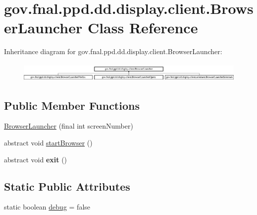 \hypertarget{classgov_1_1fnal_1_1ppd_1_1dd_1_1display_1_1client_1_1BrowserLauncher}{\section{gov.\-fnal.\-ppd.\-dd.\-display.\-client.\-Browser\-Launcher Class Reference}
\label{classgov_1_1fnal_1_1ppd_1_1dd_1_1display_1_1client_1_1BrowserLauncher}
}
Inheritance diagram for gov.\-fnal.\-ppd.\-dd.\-display.\-client.\-Browser\-Launcher\-:\begin{figure}[H]
\begin{center}
\leavevmode
\includegraphics[height=0.942761cm]{classgov_1_1fnal_1_1ppd_1_1dd_1_1display_1_1client_1_1BrowserLauncher}
\end{center}
\end{figure}
\subsection*{Public Member Functions}
\begin{DoxyCompactItemize}
\item 
\hyperlink{classgov_1_1fnal_1_1ppd_1_1dd_1_1display_1_1client_1_1BrowserLauncher_aca76d8caee5d9de33b80e3397292ca25}{Browser\-Launcher} (final int screen\-Number)
\item 
abstract void \hyperlink{classgov_1_1fnal_1_1ppd_1_1dd_1_1display_1_1client_1_1BrowserLauncher_a09da69929d79dc20075d5be2572f361c}{start\-Browser} ()
\item 
\hypertarget{classgov_1_1fnal_1_1ppd_1_1dd_1_1display_1_1client_1_1BrowserLauncher_adce8df8835d3d00a6cbad7f7c8189820}{abstract void {\bfseries exit} ()}\label{classgov_1_1fnal_1_1ppd_1_1dd_1_1display_1_1client_1_1BrowserLauncher_adce8df8835d3d00a6cbad7f7c8189820}

\end{DoxyCompactItemize}
\subsection*{Static Public Attributes}
\begin{DoxyCompactItemize}
\item 
static boolean \hyperlink{classgov_1_1fnal_1_1ppd_1_1dd_1_1display_1_1client_1_1BrowserLauncher_a1e0101712e66f938f905b9b17baf101d}{debug} = false
\end{DoxyCompactItemize}
